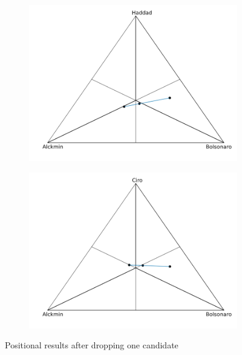 \documentclass[hidelinks,11pt]{article}
\begin{document}
\begin{figure}[!h]
\begin{subfigure}[b]{0.475\textwidth}
\includegraphics[width=\textwidth]{./images/cw1_notc.png}
            \caption{}%
            \label{fig:notcc1}
        \end{subfigure} \hfill
        \begin{subfigure}[b]{0.475\textwidth} \centering
\includegraphics[width=\textwidth]{./images/cw1_noth.png}
             \caption{}%
            \label{fig:notah1}
        \end{subfigure}
        \caption[ Positional results when dropping one candidate ] {\small
Positional results after dropping one candidate }
        \label{fig:c1dropping}
    \end{figure}
\end{document}
